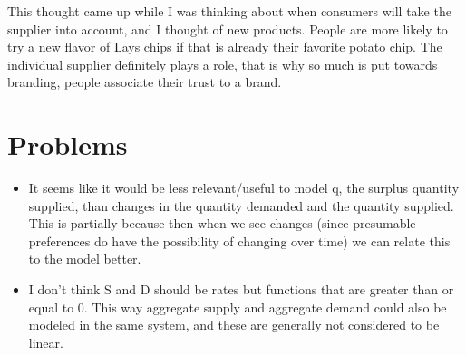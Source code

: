 \documentclass{article}
\begin{document}
This thought came up while I was thinking about when consumers will take the supplier into account, and I thought of new products. People are more likely to try a new flavor of Lays chips if that is already their favorite potato chip. The individual supplier definitely plays a role, that is why so much is put towards branding, people associate their trust to a brand. 



\section{Problems}
\begin{itemize}
	\item It seems like it would be less relevant/useful to model q, the surplus quantity supplied, than changes in the quantity demanded and the quantity supplied. This is partially because then when we see changes (since presumable preferences do have the possibility of changing over time) we can relate this to the model better.
	\item I don't think S and D should be rates but functions that are greater than or equal to 0. This way aggregate supply and aggregate demand could also be modeled in the same system, and these are generally not considered to be linear.
\end{itemize}
\end{document}
